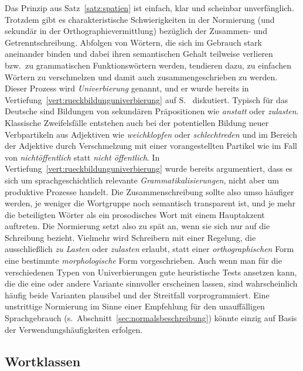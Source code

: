 Das Prinzip aus Satz~\ref{satz:spatien} ist einfach, klar und scheinbar unverfänglich.
Trotzdem gibt es charakteristische Schwierigkeiten in der Normierung (und sekundär in der Orthographievermittlung) bezüglich der Zusammen- und Getrenntschreibung.
Abfolgen von Wörtern, die sich im Gebrauch stark aneinander binden und dabei ihren semantischen Gehalt teilweise verlieren bzw.\ zu grammatischen Funktionswörtern werden, tendieren dazu, zu einfachen Wörtern zu verschmelzen und damit auch zusammengeschrieben zu werden.
Dieser Prozess wird \textit{Univerbierung} genannt, und er wurde bereits in Vertiefung~\ref{vert:rueckbildunguniverbierung} auf S.~\pageref{vert:rueckbildunguniverbierung} diskutiert.
Typisch für das Deutsche sind \zB Bildungen von sekundären Präpositionen wie \textit{anstatt} oder \textit{zulasten}.
Klassische Zweifelsfälle entstehen auch bei der potentiellen Bildung neuer Verbpartikeln aus Adjektiven wie \textit{weichklopfen} oder \textit{schlechtreden} und im Bereich der Adjektive durch Verschmelzung mit einer vorangestellten Partikel wie im Fall von \textit{nichtöffentlich} statt \textit{nicht öffentlich}.
In Vertiefung~\ref{vert:rueckbildunguniverbierung} wurde bereits argumentiert, dass es sich um sprachgeschichtlich relevante \textit{Grammatikalisierungen}, nicht aber um produktive Prozesse handelt.
Die Zusammenschreibung sollte also umso häufiger werden, je weniger die Wortgruppe noch semantisch transparent ist, und je mehr die beteiligten Wörter als ein prosodisches Wort mit einem Hauptakzent auftreten.
Die Normierung setzt also zu spät an, wenn sie sich nur auf die Schreibung bezieht.
Vielmehr wird Schreibern mit einer Regelung, die \zB ausschließlich \textit{zu Lasten} oder \textit{zulasten} erlaubt, statt einer \textit{orthographischen} Form eine bestimmte \textit{morphologische} Form vorgeschrieben.
Auch wenn man für die verschiedenen Typen von Univerbierungen gute heuristische Tests ansetzen kann, die die eine oder andere Variante sinnvoller erscheinen lassen, sind wahrscheinlich häufig beide Varianten plausibel und der Streitfall vorprogrammiert.
Eine unstrittige Normierung im Sinne einer Empfehlung für den unauffälligen Sprachgebrauch (s.\ Abschnitt~\ref{sec:normalsbeschreibung}) könnte einzig auf Basis der Verwendungshäufigkeiten erfolgen.

\subsection{Wortklassen}

